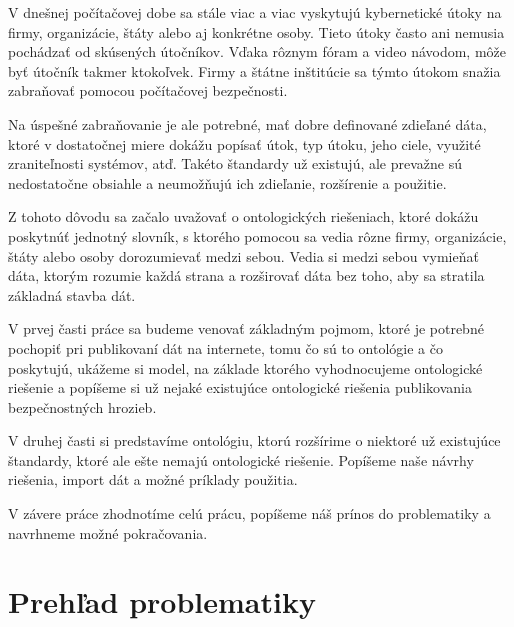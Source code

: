 \documentclass[12pt, a4paper, oneside]{book}
\begin{document}
V dnešnej počítačovej dobe sa stále viac a viac vyskytujú kybernetické útoky na firmy, organizácie, štáty alebo aj konkrétne osoby. Tieto útoky často ani nemusia pochádzať od skúsených útočníkov. Vďaka rôznym fóram a video návodom, môže byť útočník takmer ktokoľvek. Firmy a štátne inštitúcie sa týmto útokom snažia zabraňovať pomocou počítačovej bezpečnosti.


Na úspešné zabraňovanie je ale potrebné, mať dobre definované zdieľané dáta, ktoré v dostatočnej miere dokážu popísať útok, typ útoku, jeho ciele, využité zraniteľnosti systémov, atď. Takéto štandardy už existujú, ale prevažne sú nedostatočne obsiahle a neumožňujú ich zdieľanie, rozšírenie a použitie.


Z tohoto dôvodu sa začalo uvažovať o ontologických riešeniach, ktoré dokážu poskytnúť jednotný slovník, s ktorého pomocou sa vedia rôzne firmy, organizácie, štáty alebo osoby dorozumievať medzi sebou. Vedia si medzi sebou vymieňať dáta, ktorým rozumie každá strana a rozširovať dáta bez toho, aby sa stratila základná stavba dát.


V prvej časti práce sa budeme venovať základným pojmom, ktoré je potrebné pochopiť pri publikovaní dát na internete, tomu čo sú to ontológie a čo poskytujú, ukážeme si model, na základe ktorého vyhodnocujeme ontologické riešenie a popíšeme si už nejaké existujúce ontologické riešenia publikovania bezpečnostných hrozieb.


V druhej časti si predstavíme ontológiu, ktorú rozšírime o niektoré už existujúce štandardy, ktoré ale ešte nemajú ontologické riešenie. Popíšeme naše návrhy riešenia, import dát a možné príklady použitia.


V závere práce zhodnotíme celú prácu, popíšeme náš prínos do problematiky a navrhneme možné pokračovania.




\part{Prehľad problematiky}
\end{document}
